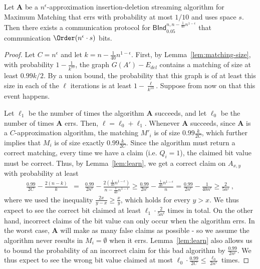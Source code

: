 \begin{theorem}\label{thm:reduction} 
 Let $\mathbf{A}$ be a $n^{\epsilon}$-approximation insertion-deletion streaming algorithm 
 for \textsf{Maximum Matching} that errs with probability at most $1/10$ and uses space $s$. Then there exists a communication 
 protocol for $\textsf{BInd}^{n,n - \frac{1}{40} n^{1-\epsilon}}_{0.05}$ that communication $\Order(n^\epsilon \cdot s)$ bits.
\end{theorem}
\begin{proof}
Let $C = n^{\epsilon}$ and let $k = n - \frac{1}{40} n^{1-\epsilon}$.
 First, by Lemma~\ref{lem:matching-size}, with probability $1-\frac{1}{k^{10}}$, the graph 
 $G(A') - E_{del}$ contains a matching of size at least $0.99 k/ 2$. By a union bound, 
 the probability that this graph is of at least this size in each of the $\ell$ iterations  
 is at least $1 - \frac{\ell}{k^{10}}$. Suppose from now on that this event happens.

 Let $\ell_1$ be the number of times the algorithm $\mathbf{A}$ succeeds, and let $\ell_0$ be the number of times $\mathbf{A}$
 errs. Then, $\ell = \ell_0 + \ell_1$. Whenever $\mathbf{A}$ succeeds, since $\mathbf{A}$ is a $C$-approximation
 algorithm, the matching $M'_i$ is of size $0.99 \frac{k}{2C}$, which further implies that $M_i$ is of size exactly
 $0.99 \frac{k}{2C}$. Since the algorithm must return a correct matching, every time we have a claim (i.e. $Q_i = 1$), the claimed bit value must be correct. Thus, by Lemma~\ref{lem:learn}, we get a correct claim on $A_{x,y}$ with probability at least 
 \begin{eqnarray*}
  \frac{0.99}{2C} - \frac{2(n - k)}{k} & = & \frac{0.99}{2n^{\epsilon}} - \frac{2(\frac{1}{40} n^{1-\epsilon})}{n - \frac{1}{40} n^{1-\epsilon}} \ge  \frac{0.99}{2n^{\epsilon}} - \frac{\frac{1}{40} n^{1-\epsilon}}{n} = \frac{0.99}{2n^{\epsilon}} - \frac{1}{40n^{\epsilon}} \ge \frac{2}{5 n^\epsilon}   \ , \label{eqn:018}
 \end{eqnarray*}
where we used the inequality $\frac{2x}{y-x} \ge \frac{x}{y}$, which holds for every $y > x$. 
We thus expect to see the correct bit claimed at least $\ell_1 \cdot \frac{2}{5 n^\epsilon}$ times in total.
On the other hand, incorrect claims of the bit value can only occur when the algorithm errs. In the worst case, $\mathbf{A}$ 
will make as many false claims as possible - so we assume the algorithm never results in $M_i = \emptyset$ when it errs. 
Lemma~\ref{lem:learn} also allows us to bound the probability of an incorrect claim for this bad algorithm by $\frac{0.99}{2n^\epsilon}$. We thus expect to see the wrong bit value claimed at most $\ell_0 \cdot \frac{0.99}{2C} \le \frac{\ell_0}{2n^\epsilon}$ times.
 

\end{proof}
